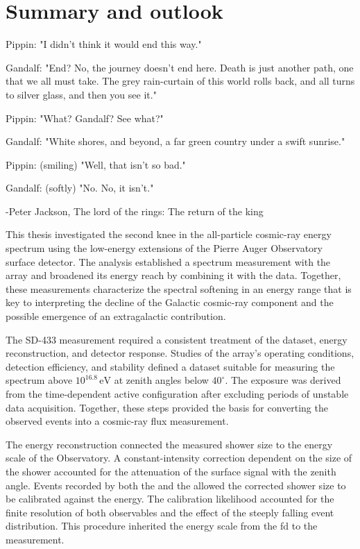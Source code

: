 \documentclass[main.tex]{subfiles}
\begin{document}
\chapter{Summary and outlook}
\label{chapter:summary}

\epigraph{
Pippin: "I didn't think it would end this way."

Gandalf: "End? No, the journey doesn't end here. Death is just another path, one that we all must take. The grey rain-curtain of this world rolls back, and all turns to silver glass, and then you see it."

Pippin: "What? Gandalf? See what?"

Gandalf: "White shores, and beyond, a far green country under a swift sunrise."

Pippin: (smiling) "Well, that isn't so bad."

Gandalf: (softly) "No. No, it isn't."}{ -Peter Jackson, The lord of the rings: The return of the king}





This thesis investigated the second knee in the all-particle cosmic-ray energy spectrum using the low-energy extensions of the Pierre Auger Observatory surface detector. The analysis established a spectrum measurement with the  array and broadened its energy reach by combining it with the  data. Together, these measurements characterize the spectral softening in an energy range that is key to interpreting the decline of the Galactic cosmic-ray component and the possible emergence of an extragalactic contribution.

The SD-433 measurement required a consistent treatment of the dataset, energy reconstruction, and detector response. Studies of the array’s operating conditions, detection efficiency, and stability defined a dataset suitable for measuring the spectrum above \(10^{16.8}\,\mathrm{eV}\) at zenith angles below \(40^\circ\). The exposure was derived from the time-dependent active configuration after excluding periods of unstable data acquisition. Together, these steps provided the basis for converting the observed events into a cosmic-ray flux measurement.

The energy reconstruction connected the measured shower size to the energy scale of the Observatory. A constant-intensity correction dependent on the size of the shower accounted for the attenuation of the surface signal with the zenith angle. 
Events recorded by both the  and the  allowed the corrected  shower size to be calibrated against the  energy.
The calibration likelihood accounted for the finite resolution of both observables and the effect of the steeply falling event distribution. This procedure inherited the energy scale from the \gls{fd} to the  measurement.
\end{document}
